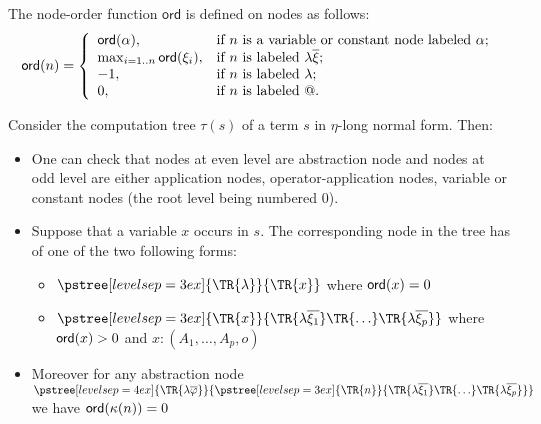 \begin{dfn}

 The node-order function $\textsf{ord}$
is defined on nodes as follows:
\begin{eqnarray*}
{\sf ord}(n) = \left\{
  \begin{array}{ll}
    {\sf ord}(\alpha), & \hbox{if $n$ is a variable or constant node labeled $\alpha $;} \\
    \max_{i=1..n} {\sf ord}(\xi_i), & \hbox{if $n$ is labeled $\lambda \overline{\xi}$;} \\
    -1, & \hbox{if $n$ is labeled $\lambda$;} \\
    0, & \hbox{if $n$ is labeled $@$.}
  \end{array}
\right.
\end{eqnarray*}
\end{dfn}


Consider the computation tree $\tau(s)$ of a term $s$ in $\eta$-long normal form. Then:
\begin{itemize}
\item One can check that nodes at even level are abstraction
node and nodes at odd level are either application nodes,
operator-application nodes, variable or constant nodes (the root level being numbered $0$).

\item Suppose that a variable $x$ occurs in $s$. The corresponding node in the tree has of one of the two following forms:
    \begin{itemize}
    \item $ \pstree[levelsep=3ex]
        { \TR{\lambda } }
        { \TR{x}
        }$ where ${\sf ord}(x) = 0$

    \item $ \pstree[levelsep=3ex]
                { \TR{x} }
                { \TR{\lambda \overline{\xi_1}} \TR{\ldots} \TR{\lambda \overline{\xi_p}}}
        $ where ${\sf ord}(x) > 0$ and $x:(A_1,\ldots,A_p,o)$
    \end{itemize}

\item    Moreover for any abstraction node
        $ \pstree[levelsep=4ex]
            { \TR{\lambda \overline{\varphi}} }
            { \pstree[levelsep=3ex]
                {\TR{n}}
                {\TR{\lambda \overline{\xi_1}} \TR{\ldots} \TR{\lambda \overline{\xi_p}}}
            }
        $
    we have ${\sf ord}(\kappa(n))=0$

\end{itemize}




